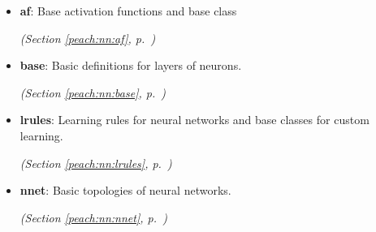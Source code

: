 \begin{itemize}
\setlength{\parskip}{0ex}
\item \textbf{af}: 
Base activation functions and base class


  \textit{(Section \ref{peach:nn:af}, p.~\pageref{peach:nn:af})}

\item \textbf{base}: 
Basic definitions for layers of neurons.


  \textit{(Section \ref{peach:nn:base}, p.~\pageref{peach:nn:base})}

\item \textbf{lrules}: 
Learning rules for neural networks and base classes for custom learning.


  \textit{(Section \ref{peach:nn:lrules}, p.~\pageref{peach:nn:lrules})}

\item \textbf{nnet}: 
Basic topologies of neural networks.


  \textit{(Section \ref{peach:nn:nnet}, p.~\pageref{peach:nn:nnet})}

\end{itemize}

